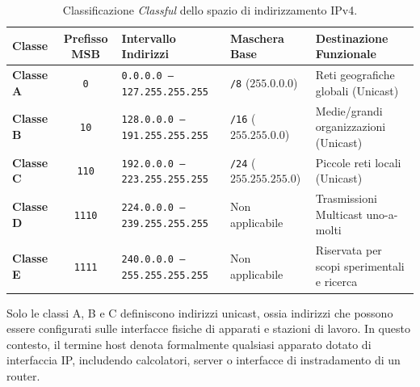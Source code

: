 \documentclass[11pt, a4paper]{article}
\begin{document}

\begin{table}[H]
\centering
\small %
\renewcommand{\arraystretch}{1.25} %
\setlength{\tabcolsep}{5pt} %
\caption{Classificazione \emph{Classful} dello spazio di indirizzamento IPv4.}
\label{tab:classful}

\begin{tabularx}{\linewidth}{l c l l >{\raggedright\arraybackslash}X}
\toprule
\textbf{Classe} & \textbf{Prefisso MSB} & \textbf{Intervallo Indirizzi} & \textbf{Maschera Base} & \textbf{Destinazione Funzionale} \\
\midrule
\textbf{Classe A} & \texttt{0} & \texttt{0.0.0.0 -- 127.255.255.255} & \texttt{/8} ($255.0.0.0$) & Reti geografiche globali (Unicast) \\
\textbf{Classe B} & \texttt{10} & \texttt{128.0.0.0 -- 191.255.255.255} & \texttt{/16} ($255.255.0.0$) & Medie/grandi organizzazioni (Unicast) \\
\textbf{Classe C} & \texttt{110} & \texttt{192.0.0.0 -- 223.255.255.255} & \texttt{/24} ($255.255.255.0$) & Piccole reti locali (Unicast) \\
\textbf{Classe D} & \texttt{1110} & \texttt{224.0.0.0 -- 239.255.255.255} & Non applicabile & Trasmissioni Multicast uno-a-molti \\
\textbf{Classe E} & \texttt{1111} & \texttt{240.0.0.0 -- 255.255.255.255} & Non applicabile & Riservata per scopi sperimentali e ricerca \\
\bottomrule
\end{tabularx}
\end{table}

Solo le classi A, B e C definiscono indirizzi unicast, ossia indirizzi che possono essere configurati sulle interfacce fisiche di apparati e stazioni di lavoro. In questo contesto, il termine host denota formalmente qualsiasi apparato dotato di interfaccia IP, includendo calcolatori, server o interfacce di instradamento di un router.
\end{document}
